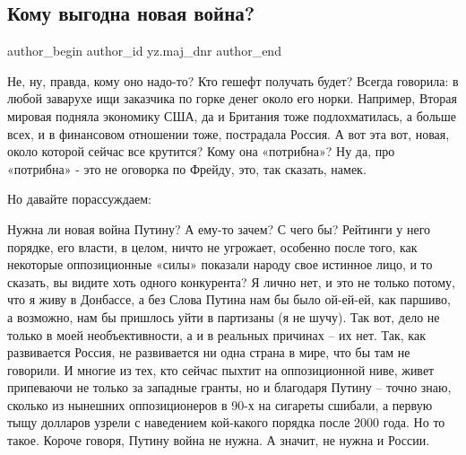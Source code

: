  
 
 
 
 
 
\subsection{Кому выгодна новая война?}
\label{sec:27_01_2022.yz.maj_dnr.1.komu_vygodna_novaja_vojna}
 
\ifcmt
 author_begin
   author_id yz.maj_dnr
 author_end
\fi

Не, ну, правда, кому оно надо-то? Кто гешефт получать будет? Всегда говорила: в
любой заварухе ищи заказчика по горке денег около его норки. Например, Вторая
мировая подняла экономику США, да и Британия тоже подлохматилась, а больше
всех, и в финансовом отношении тоже, пострадала Россия. А вот эта вот, новая,
около которой сейчас все крутится? Кому она «потрибна»? Ну да, про «потрибна» -
это не оговорка по Фрейду, это, так сказать, намек.


Но давайте порассуждаем:

Нужна ли новая война Путину? А ему-то зачем? С чего бы? Рейтинги у него
порядке, его власти, в целом, ничто не угрожает, особенно после того, как
некоторые оппозиционные «силы» показали народу свое истинное лицо, и то
сказать, вы видите хоть одного конкурента? Я лично нет, и это не только потому,
что я живу в Донбассе, а без Слова Путина нам бы было ой-ей-ей, как паршиво, а
возможно, нам бы пришлось уйти в партизаны (я не шучу). Так вот, дело не только
в моей необъективности, а и в реальных причинах – их нет. Так, как развивается
Россия, не развивается ни одна страна в мире, что бы там не говорили. И многие
из тех, кто сейчас пыхтит на оппозиционной ниве, живет припеваючи не только за
западные гранты, но и благодаря Путину – точно знаю, сколько из нынешних
оппозиционеров в 90-х на сигареты сшибали, а первую тыщу долларов узрели с
наведением кой-какого порядка после 2000 года. Но то такое. Короче говоря,
Путину война не нужна. А значит, не нужна и России.

